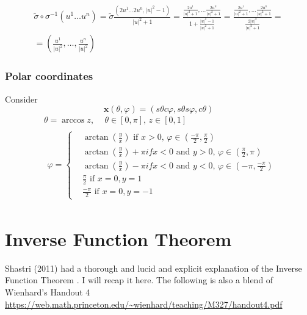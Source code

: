 \documentclass[10pt]{amsart}
\begin{document}
\begin{multicols*}{2}
\begin{enumerate}
\[
\begin{gathered}
	\widetilde{\sigma} \circ \sigma^{-1}(u^1 \dots u^n) = \widetilde{\sigma} \frac{(2u^1 \dots 2u^n, |u|^2-1) }{ |u|^2 +  1} = \frac{ \frac{2u^1}{ |u|^2 + 1} , \dots \frac{2u^n}{ |u|^2 + 1} }{ 1 + \frac{ |u|^2 - 1 }{ |u|^2 + 1} } = \frac{ \frac{2u^1}{ |u|^2 + 1} , \dots \frac{2u^n}{ |u|^2 + 1} }{  \frac{2|u|^2}{ |u|^2 + 1} } = \\
	= \boxed{ \left( \frac{u^1}{ |u|^2} , \dots , \frac{u^n}{ |u|^2} \right) }
\end{gathered}
\]

\end{enumerate}

\subsubsection{Polar coordinates}

Consider 
\[
\mathbf{x}(\theta, \varphi) = (s\theta c\varphi, s\theta s\varphi, c\theta)
\]
\[
\begin{aligned}
& \theta = \arccos{z}, \quad \, \theta \in [0, \pi] , \, z \in [0,1] \\
& \begin{gathered}
\varphi = \begin{cases}
	& \arctan{ \left( \frac{y}{x} \right) } \text{ if } x > 0, \, \varphi \in ( \frac{-\pi}{2}, \frac{\pi}{2}) \\
	& \arctan{ \left( \frac{y}{x} \right) }  + \pi if x < 0 \text{ and } y > 0, \, \varphi \in (\frac{\pi}{2}, \pi) \\
	& \arctan{ \left( \frac{y}{x} \right) }  - \pi if x < 0 \text{ and } y < 0, \, \varphi \in (-\pi, \frac{-\pi}{2}) \\ 
	& \frac{\pi}{2} \text{ if } x = 0, y = 1\\
	& \frac{-\pi}{2} \text{ if } x= 0 , y = -1
\end{cases}	
\end{gathered}
\end{aligned}
\]


\section{Inverse Function Theorem}

Shastri (2011) had a thorough and lucid and explicit explanation of the Inverse Function Theorem \cite{AShastri2011}.  I will recap it here.  The following is also a blend of Wienhard's Handout 4 \url{https://web.math.princeton.edu/~wienhard/teaching/M327/handout4.pdf}


\end{multicols*}
\end{document}
